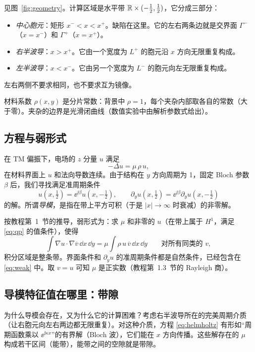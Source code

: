 \documentclass[11pt,a4paper,fontset=fandol]{ctexart}
\begin{document}
见图~\ref{fig:geometry}。计算区域是水平带 $\mathbb R\times(-\tfrac12,\tfrac12)$，它分成三部分：
\begin{itemize}
\item \emph{中心胞元}：矩形 $x^-<x<x^+$。缺陷在这里。它的左右两条边就是交界面 $\Gamma^-$（$x=x^-$）和 $\Gamma^+$（$x=x^+$）。
\item \emph{右半波导}：$x>x^+$。它由一个宽度为 $L^+$ 的胞元沿 $x$ 方向无限重复构成。
\item \emph{左半波导}：$x<x^-$。它由另一个宽度为 $L^-$ 的胞元向左无限重复构成。
\end{itemize}
左右两侧不要求相同，也不要求互为镜像。

材料系数 $\rho(x,y)$ 是分片常数：背景中 $\rho=1$，每个夹杂内部取各自的常数（大于零）。夹杂的边界是光滑闭曲线（数值实验中由解析参数式给出）。

\subsection{方程与弱形式}

在 TM 偏振下，电场的 $z$ 分量 $u$ 满足
\begin{equation}
\label{eq:helmholtz}
-\Delta u=\mu\,\rho\,u ,
\end{equation}
在材料界面上 $u$ 和法向导数连续。由于结构在 $y$ 方向周期为 1，固定 Bloch 参数 $\beta$ 后，我们寻找满足准周期条件
\begin{equation}
\label{eq:qp}
u(x,\tfrac12)=\ee^{\ii\beta}u(x,-\tfrac12),\qquad \partial_yu(x,\tfrac12)=\ee^{\ii\beta}\partial_yu(x,-\tfrac12)
\end{equation}
的解。所谓\emph{导模}，是指在带上平方可积（于是 $|x|\to\infty$ 时衰减）的非零解。

按教程第~1~节的推导，弱形式为：求 $\mu$ 和非零的 $u$（在带上属于 $H^1$，满足 \eqref{eq:qp} 的值条件），使得
\begin{equation}
\label{eq:weak}
\int\nabla u\cdot\nabla\overline v\,\dd x\,\dd y=\mu\int\rho\,u\,\overline v\,\dd x\,\dd y\qquad\text{对所有同类的 }v ,
\end{equation}
积分区域是整条带。界面条件和 $\partial_yu$ 的准周期条件都是自然条件，已经包含在 \eqref{eq:weak} 中。取 $v=u$ 可知 $\mu$ 是正实数（教程第~1.3~节的 Rayleigh 商）。

\subsection{导模特征值在哪里：带隙}

为什么导模会存在，又为什么它的计算困难？考虑右半波导所在的完美周期介质（让右胞元向左右两边都无限重复）。对这种介质，方程 \eqref{eq:helmholtz} 有形如“周期函数乘以 $\ee^{\ii\kappa x}$”的有界解（Bloch 波），它们能在 $x$ 方向传播。这些解存在的 $\mu$ 构成若干区间（能带），能带之间的空隙就是带隙。
\end{document}

